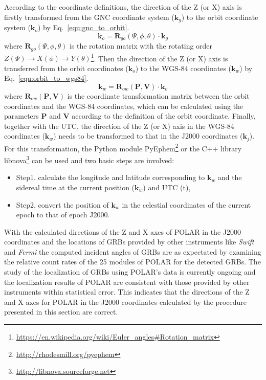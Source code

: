\documentclass{raa}
\begin{document}
According to the coordinate definitions, the direction of the Z (or X) axis is firstly transformed from the GNC coordinate system ($\bm{k}_g$) to the orbit coordinate system ($\bm{k}_o$) by Eq.~\eqref{equ:gnc_to_orbit}.
\begin{equation}\label{equ:gnc_to_orbit}
\bm{k}_o = \bm{R}_{go}(\Psi, \phi, \theta) \cdot \bm{k}_g
\end{equation}
where $\bm{R}_{go}(\Psi, \phi, \theta)$ is the rotation matrix with the rotating order $Z(\Psi) \rightarrow X(\phi) \rightarrow Y(\theta)$\footnote{\url{https://en.wikipedia.org/wiki/Euler\_angles\#Rotation\_matrix}}. Then the direction of the Z (or X) axis is transferred from the orbit coordinates ($\bm{k}_o$) to the WGS-84 coordinates ($\bm{k}_w$) by Eq.~\eqref{equ:orbit_to_wgs84}.
\begin{equation}\label{equ:orbit_to_wgs84}
\bm{k}_w = \bm{R}_{ow}(\bm{P}, \bm{V}) \cdot \bm{k}_o
\end{equation}
where $\bm{R}_{ow}(\bm{P}, \bm{V})$ is the coordinate transformation matrix between the orbit coordinates and the WGS-84 coordinates, which can be calculated using the parameters $\bm{P}$ and $\bm{V}$ according to the definition of the orbit coordinate. Finally, together with the UTC, the direction of the Z (or X) axis in the WGS-84 coordinates ($\bm{k}_w$) needs to be transformed to that in the J2000 coordinates ($\bm{k}_j$). For this transformation, the Python module PyEphem\footnote{\url{http://rhodesmill.org/pyephem}} or the C++ library libnova\footnote{\url{http://libnova.sourceforge.net}} can be used and two basic steps are involved:
\begin{itemize}
\item Step1. calculate the longitude and latitude corresponding to $\bm{k}_w$ and the sidereal time at the current position ($\bm{k}_w$) and UTC (t),
\item Step2. convert the position of $\bm{k}_w$ in the celestial coordinates of the current epoch to that of epoch J2000.
\end{itemize}

With the calculated directions of the Z and X axes of POLAR in the J2000 coordinates and the locations of GRBs provided by other instruments like \textit{Swift} and \textit{Fermi} the computed incident angles of GRBs are as expectated by examining the relative count rates of the 25 modules of POLAR for the detected GRBs. The study of the localization of GRBs using POLAR's data is currently ongoing and the localization results of POLAR are consistent with those provided by other instruments within statistical error. This indicates that the directions of the Z and X axes for POLAR in the J2000 coordinates calculated by the procedure presented in this section are correct.
\end{document}
